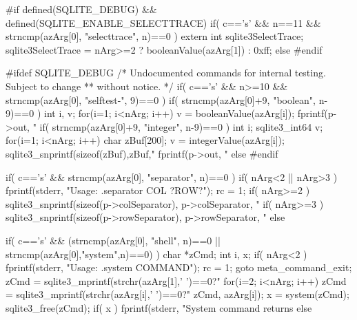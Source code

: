 \begin{Codex}[label=shell.c,numbers=left]
{#if defined(SQLITE_DEBUG) && defined(SQLITE_ENABLE_SELECTTRACE)
  if( c=='s' && n==11 && strncmp(azArg[0], "selecttrace", n)==0 ){
    extern int sqlite3SelectTrace;
    sqlite3SelectTrace = nArg>=2 ? booleanValue(azArg[1]) : 0xff;
  }else
#endif


#ifdef SQLITE_DEBUG
  /* Undocumented commands for internal testing.  Subject to change
  ** without notice. */
  if( c=='s' && n>=10 && strncmp(azArg[0], "selftest-", 9)==0 ){
    if( strncmp(azArg[0]+9, "boolean", n-9)==0 ){
      int i, v;
      for(i=1; i<nArg; i++){
        v = booleanValue(azArg[i]);
        fprintf(p->out, "%
      }
    }
    if( strncmp(azArg[0]+9, "integer", n-9)==0 ){
      int i; sqlite3_int64 v;
      for(i=1; i<nArg; i++){
        char zBuf[200];
        v = integerValue(azArg[i]);
        sqlite3_snprintf(sizeof(zBuf),zBuf,"%
        fprintf(p->out, "%
      }
    }
  }else
#endif

  if( c=='s' && strncmp(azArg[0], "separator", n)==0 ){
    if( nArg<2 || nArg>3 ){
      fprintf(stderr, "Usage: .separator COL ?ROW?\n");
      rc = 1;
    }
    if( nArg>=2 ){
      sqlite3_snprintf(sizeof(p->colSeparator), p->colSeparator,
                       "%
    }
    if( nArg>=3 ){
      sqlite3_snprintf(sizeof(p->rowSeparator), p->rowSeparator,
                       "%
    }
  }else

  if( c=='s'
   && (strncmp(azArg[0], "shell", n)==0 || strncmp(azArg[0],"system",n)==0)
  ){
    char *zCmd;
    int i, x;
    if( nArg<2 ){
      fprintf(stderr, "Usage: .system COMMAND\n");
      rc = 1;
      goto meta_command_exit;
    }
    zCmd = sqlite3_mprintf(strchr(azArg[1],' ')==0?"%
    for(i=2; i<nArg; i++){
      zCmd = sqlite3_mprintf(strchr(azArg[i],' ')==0?"%
                             zCmd, azArg[i]);
    }
    x = system(zCmd);
    sqlite3_free(zCmd);
    if( x ) fprintf(stderr, "System command returns %
  }else

}
\end{Codex}
